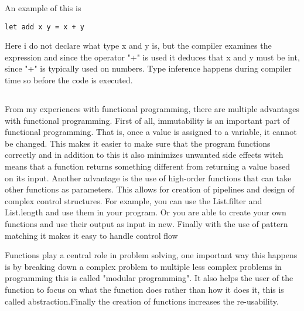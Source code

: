 \documentclass{article}
\begin{document}
An example of this is 

 \begin{lstlisting}
let add x y = x + y
\end{lstlisting}

Here i do not declare what type x and y is, but the compiler examines the expression and since the operator "+" is used it deduces that x and y must be int, since "+" is typically used on numbers.
Type inference happens during compiler time so before the code is executed. 


\subsection{}

From my experiences with functional programming, there are multiple advantages with functional programming. First of all, immutability is an important part of functional programming. That is, once a value is assigned to a variable, it cannot be changed. This makes it easier to make sure that the program functions correctly and  in addition to this it also minimizes unwanted side effects witch means that a function returns something different from returning a value based on its input. Another advantage is the use of high-order functions that can take other functions as parameters. This allows for creation of pipelines and design of complex control structures. For example, you can use the List.filter and List.length and use them in your program. Or you are able to create your own functions and use their output as input in new. Finally with the use of pattern matching it makes it easy to handle control flow

Functions play a central role in problem solving, one important way this happens is by breaking down a complex problem to multiple less complex problems in programming this is called "modular programming".
It also helps the user of the function to focus on what the function does rather than how it does it, this is called abstraction.Finally the creation of functions increases the re-usability.
\end{document}

